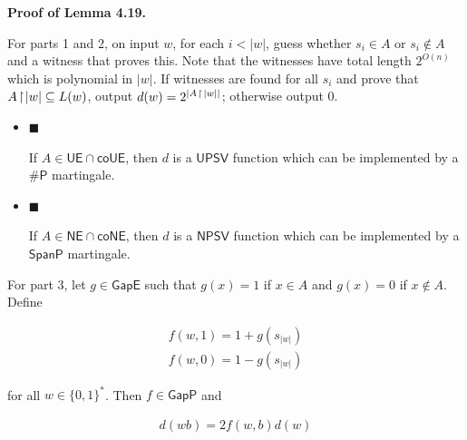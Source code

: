 \documentclass[10pt,a4paper]{article}
\begin{document}



\par\medskip\noindent\textbf{Proof of Lemma 4.19.}\par




For parts 1 and 2, on input $w$, for each $i<|w|$, guess whether $s_{i}\in A$ or $s_{i}\not\in A$ and a witness that proves this.
Note that the witnesses have total length $2^{O(n)}$ which is polynomial in $|w|$. If witnesses are found for all $s_{i}$ and prove that $A\negthinspace\upharpoonright\negthinspace|w|\subseteq L(w)$, output $d(w)=2^{|A\;\negthinspace\upharpoonright\negthinspace\;|w||}$; otherwise output $0$.\par


\begin{itemize}


\item[] 
$\blacksquare$ 


If $A\in\mathsf{UE}\cap\mathsf{co}\mathsf{UE}$, then $d$ is a $\mathsf{UPSV}$ function which can be implemented by a ${\mathsf{\#}\mathsf{P}}$ martingale.\par





\item[] 
$\blacksquare$ 


If $A\in\mathsf{NE}\cap\mathsf{co}\mathsf{NE}$, then $d$ is a $\mathsf{NPSV}$ function which can be implemented by a $\mathsf{SpanP}$ martingale.\par





\end{itemize}


For part 3, let $g\in\mathsf{GapE}$ such that $g(x)=1$ if $x\in A$ and $g(x)=0$ if $x\not\in A$. Define\par


\[\begin{gathered}
\displaystyle f(w,1) \displaystyle= \displaystyle 1+g(s_{|w|}) \\
\displaystyle f(w,0) \displaystyle= \displaystyle 1-g(s_{|w|})
\end{gathered}\]


for all $w\in\{0,1\}^{*}$. Then $f\in\mathsf{GapP}$ and\par


\[\begin{gathered}
d(wb)=2f(w,b)d(w)
\end{gathered}\]
\end{document}
